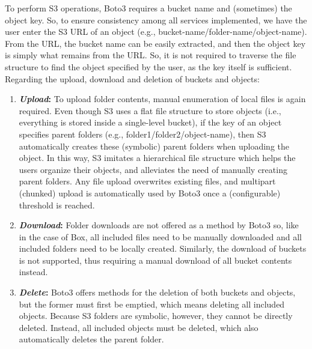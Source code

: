To perform S3 operations, Boto3 requires a bucket name and (sometimes) the object key. So, to ensure consistency among all services implemented, we have the user enter the S3 URL of an object (e.g., bucket-name/folder-name/object-name). From the URL, the bucket name can be easily extracted, and then the object key is simply what remains from the URL. So, it is not required to traverse the file structure to find the object specified by the user, as the key itself is sufficient. Regarding the upload, download and deletion of buckets and objects: ~\cite{s3_docs}

 \begin{enumerate}
 	\item \textbf{\textit{Upload}:} To upload folder contents, manual enumeration of local files is again required. Even though S3 uses a flat file structure to store objects (i.e., everything is stored inside a single-level bucket), if the key of an object specifies parent folders (e.g., folder1/folder2/object-name), then S3 automatically creates these (symbolic) parent folders when uploading the object. In this way, S3 imitates a hierarchical file structure which helps the users organize their objects, and alleviates the need of manually creating parent folders. Any file upload overwrites existing files, and multipart (chunked) upload is automatically used by Boto3 once a (configurable) threshold is reached.
 	
 	\item \textbf{\textit{Download}:} Folder downloads are not offered as a method by Boto3 so, like in the case of Box, all included files need to be manually downloaded and all included folders need to be locally created. Similarly, the download of buckets is not supported, thus requiring a manual download of all bucket contents instead.
 	
 	\item \textbf{\textit{Delete}:} Boto3 offers methods for the deletion of both buckets and objects, but the former must first be emptied, which means deleting all included objects. Because S3 folders are symbolic, however, they cannot be directly deleted. Instead, all included objects must be deleted, which also automatically deletes the parent folder.
 \end{enumerate}